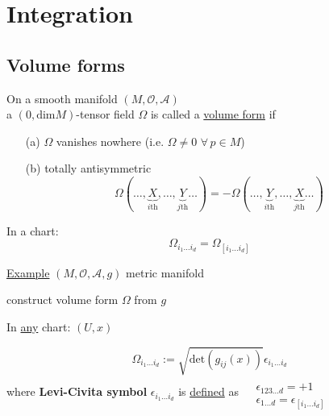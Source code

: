 \section{Integration}

\subsection{}

\subsection{}

\subsection{Volume forms}

\begin{definition}
On a smooth manifold $(M,\mathcal{O},\mathcal{A})$ \\
a $(0,\text{dim}M)$-tensor field $\Omega$ is called a \underline{volume form} if 
\begin{enumerate}
\item[(a)] $\Omega$ vanishes nowhere (i.e. $\Omega \neq 0 \, \, \forall \, p \in M$) 
\item[(b)] totally antisymmetric 
\[
\Omega(\dots , \underbrace{X}_{i\text{th}} , \dots , \underbrace{Y}_{j\text{th}} \dots ) = - \Omega(\dots , \underbrace{Y}_{i\text{th}} , \dots , \underbrace{X}_{j\text{th}} \dots )
\]
\end{enumerate}

In a chart: 
\[
\Omega_{i_1 \dots i_d} = \Omega_{ [i_1 \dots i_d ]}
\]
\end{definition}

\underline{Example} $(M,\mathcal{O}, \mathcal{A},g)$ metric manifold

construct volume form $\Omega$ from $g$

In \underline{any} chart: $(U,x)$

\[
\Omega_{i_1 \dots i_d} := \sqrt{ \text{det}(g_{ij}(x)) } \epsilon_{i_1 \dots i_d} 
\]
where \textbf{Levi-Civita symbol} $\epsilon_{i_1 \dots i_d}$ is \underline{defined} as $\begin{aligned} & \quad \\ 
& \epsilon_{123 \dots d} = +1 \\ 
& \epsilon_{1\dots d} = \epsilon_{[i_1 \dots i_d]} \end{aligned}$

